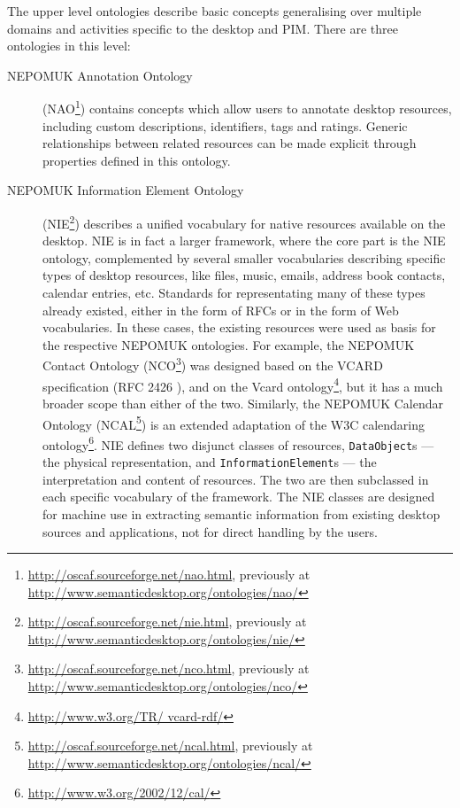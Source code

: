 The upper level ontologies describe basic concepts generalising over multiple domains and activities specific to the desktop and PIM. There are three ontologies in this level: 
\begin{description}
 \item[NEPOMUK Annotation Ontology] (NAO\footnote{\url{http://oscaf.sourceforge.net/nao.html}, previously at \url{http://www.semanticdesktop.org/ontologies/nao/}}) contains concepts which allow users to annotate desktop resources, including custom descriptions, identifiers, tags and ratings. Generic relationships between related resources can be made explicit through properties defined in this ontology.
 \item[NEPOMUK Information Element Ontology] (NIE\footnote{\url{http://oscaf.sourceforge.net/nie.html}, previously at \url{http://www.semanticdesktop.org/ontologies/nie/}}) describes a unified vocabulary for native resources available on the desktop. NIE is in fact a larger framework, where the core part is the NIE ontology, complemented by several smaller vocabularies describing specific types of desktop resources, like files, music, emails, address book contacts, calendar entries, etc. Standards for representating many of these types already existed, either in the form of RFCs or in the form of Web vocabularies. In these cases, the existing resources were used as basis for the respective NEPOMUK ontologies. For example, the NEPOMUK Contact Ontology (NCO\footnote{\url{http://oscaf.sourceforge.net/nco.html}, previously at \url{http://www.semanticdesktop.org/ontologies/nco/}}) was designed based on the VCARD specification (RFC 2426 \cite{RFC2426}), and on the Vcard ontology\footnote{\url{http://www.w3.org/TR/
vcard-rdf/}}, but it has a much broader scope than either of the two. Similarly, the NEPOMUK Calendar Ontology (NCAL\footnote{\url{http://oscaf.sourceforge.net/ncal.html}, previously at \url{http://www.semanticdesktop.org/ontologies/ncal/}}) is an extended adaptation of the W3C calendaring ontology\footnote{\url{http://www.w3.org/2002/12/cal/}}. NIE defines two disjunct classes of resources, \verb|DataObject|s --- the physical representation, and \verb|InformationElement|s --- the interpretation and content of resources. The two are then subclassed in each specific vocabulary of the framework. The NIE classes are designed for machine use in extracting semantic information from existing desktop sources and applications, not for direct handling by the users.

\end{description}
